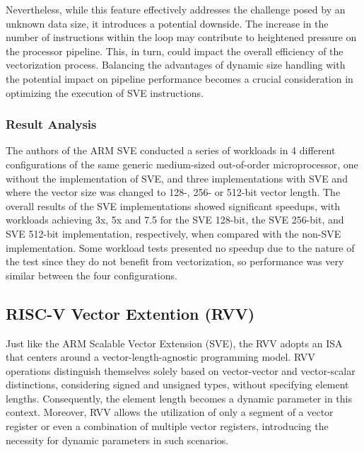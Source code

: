 Nevertheless, while this feature effectively addresses the challenge posed by an unknown data size, it introduces a potential downside. The increase in the number of instructions within the loop may contribute to heightened pressure on the processor pipeline. This, in turn, could impact the overall efficiency of the vectorization process. Balancing the advantages of dynamic size handling with the potential impact on pipeline performance becomes a crucial consideration in optimizing the execution of SVE instructions.

\subsubsection{Result Analysis}

 The authors of the ARM SVE \cite{arm-paper} conducted a series of workloads in 4 different configurations of the same generic medium-sized out-of-order microprocessor, one without the implementation of SVE, and three implementations with SVE and where the vector size was changed to 128-, 256- or 512-bit vector length.
The overall results of the SVE implementations showed significant speedups, with workloads achieving 3x, 5x and 7.5 for the SVE 128-bit, the SVE 256-bit, and  SVE 512-bit implementation, respectively, when compared with the non-SVE implementation. Some workload tests presented no speedup due to the nature of the test since they do not benefit from vectorization, so performance was very similar between the four configurations.



\subsection{RISC-V Vector Extention (RVV)}
\label{label:rvv}

Just like the ARM Scalable Vector Extension (SVE), the \acrfull{RVV} adopts an \acrfull{ISA} that centers around a vector-length-agnostic programming model. \acrshort{RVV} operations distinguish themselves solely based on vector-vector and vector-scalar distinctions, considering signed and unsigned types, without specifying element lengths. Consequently, the element length becomes a dynamic parameter in this context. Moreover, \acrshort{RVV} allows the utilization of only a segment of a vector register or even a combination of multiple vector registers, introducing the necessity for dynamic parameters in such scenarios.




